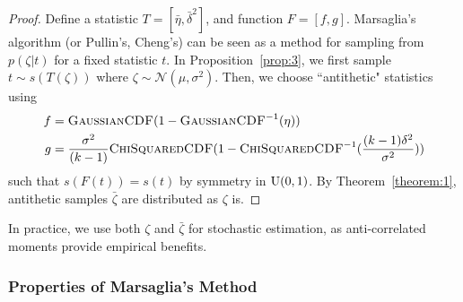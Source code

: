 \begin{proof}
Define a statistic $T  = [\bar{\eta}, \bar{\delta}^2]$, and function $F = [f, g]$. Marsaglia's algorithm (or Pullin's, Cheng's) can be seen as a method for sampling from $p(\zeta|t)$ for a fixed statistic $t$. In Proposition~\ref{prop:3}, we first sample $t \sim s(T(\zeta))$ where $\zeta \sim \mathcal{N}(\mu, \sigma^2)$. Then, we choose ``antithetic" statistics using
\begin{align*}
    f & = \textsc{GaussianCDF}(1 - \textsc{GaussianCDF}^{-1}(\eta)) \\
    g & = \frac{\sigma^2}{(k-1)}\textsc{ChiSquaredCDF}(1 - \textsc{ChiSquaredCDF}^{-1}(\frac{(k-1)\delta^2}{\sigma^2}))
\end{align*}
such that $s(F(t)) = s(t)$ by symmetry in $\textup{U}(0, 1)$. By Theorem~\ref{theorem:1}, antithetic samples $\bar{\zeta}$ are distributed as $\zeta$ is.
\end{proof}
In practice, we use both $\zeta$ and $\bar{\zeta}$ for stochastic estimation, as anti-correlated moments provide empirical benefits.

\subsubsection{Properties of Marsaglia's Method}

